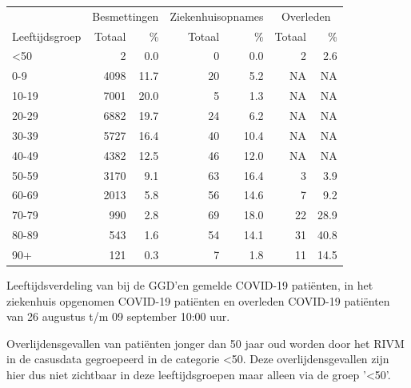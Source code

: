 \documentclass[
  english,
  man,floatsintext]{apa6}
\begin{document}
\begin{table}
\centering\begingroup\fontsize{11}{13}\selectfont

\begin{threeparttable}
\begin{tabular}{lrrrrrr}
\toprule
\multicolumn{1}{c}{ } & \multicolumn{2}{c}{Besmettingen} & \multicolumn{2}{c}{Ziekenhuisopnames} & \multicolumn{2}{c}{Overleden} \\
\cmidrule(l{3pt}r{3pt}){2-3} \cmidrule(l{3pt}r{3pt}){4-5} \cmidrule(l{3pt}r{3pt}){6-7}
Leeftijdsgroep & Totaal & \% & Totaal & \% & Totaal & \%\\
\midrule
<50 & 2 & 0.0 & 0 & 0.0 & 2 & 2.6\\
0-9 & 4098 & 11.7 & 20 & 5.2 & NA & NA\\
10-19 & 7001 & 20.0 & 5 & 1.3 & NA & NA\\
20-29 & 6882 & 19.7 & 24 & 6.2 & NA & NA\\
30-39 & 5727 & 16.4 & 40 & 10.4 & NA & NA\\
40-49 & 4382 & 12.5 & 46 & 12.0 & NA & NA\\
50-59 & 3170 & 9.1 & 63 & 16.4 & 3 & 3.9\\
60-69 & 2013 & 5.8 & 56 & 14.6 & 7 & 9.2\\
70-79 & 990 & 2.8 & 69 & 18.0 & 22 & 28.9\\
80-89 & 543 & 1.6 & 54 & 14.1 & 31 & 40.8\\
90+ & 121 & 0.3 & 7 & 1.8 & 11 & 14.5\\
\bottomrule
\end{tabular}
\begin{tablenotes}
\item[1] Leeftijdsverdeling van bij de GGD’en gemelde COVID-19 patiënten, in het ziekenhuis opgenomen COVID-19 patiënten en overleden COVID-19 patiënten van 26 augustus t/m 09 september 10:00 uur.
\item[2] Overlijdensgevallen van patiënten jonger dan 50 jaar oud worden door het RIVM in de casusdata gegroepeerd in de categorie <50. Deze overlijdensgevallen zijn hier dus niet zichtbaar in deze leeftijdsgroepen maar alleen via de groep '<50'.
\end{tablenotes}
\end{threeparttable}
\endgroup{}
\end{table}

\newpage
\end{document}
